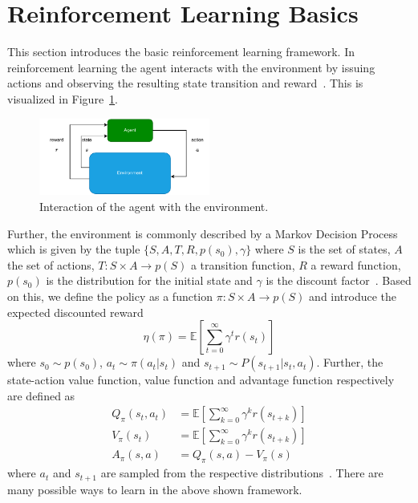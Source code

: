 \section{Reinforcement Learning Basics}\label{sec:reinforcement-learning-basics}
This section introduces the basic reinforcement learning framework.
In reinforcement learning the agent interacts with the environment by issuing actions and observing
the resulting state transition and reward~\cite{Sutton1998}.
This is visualized in Figure~\ref{fig:RL_env}.
\begin{figure}[t]
    \centering
    \includegraphics[width=0.5\textwidth]{images/presentation/RL_env.pdf}
    \caption{Interaction of the agent with the environment.}
    \label{fig:RL_env}
\end{figure}
Further, the environment is commonly described by a Markov Decision Process which is given by the tuple
$\{S, A, T, R, p(s_0), \gamma\}$ where $S$ is the set of states, $A$ the set of actions, $T: S\times A\to p(S)$ a transition
function, $R$ a reward function, $p(s_0)$ is the distribution for the initial state and
$\gamma$ is the discount factor~\cite{Moerland2020}.
Based on this, we define the policy as a function $\pi: S\times A \to p(S)$ and introduce the expected discounted reward~\cite{Schulman2015TrustRP}
\begin{equation}
    \eta(\pi) = \mathbb{E}\left[ \sum_{t=0}^\infty \gamma^t r(s_t) \right]
\end{equation}
where $s_0\sim p(s_0)$, $a_t\sim\pi(a_t|s_t)$ and $s_{t+1} \sim P(s_{t+1} | s_t, a_t)$.
Further, the state-action value function, value function and advantage function respectively are defined as
\begin{align}
    Q_\pi(s_t, a_t) &= \mathbb{E}\left[ \sum_{k=0}^\infty \gamma^kr(s_{t+k}) \right]\\
    V_{\pi}(s_t) &= \mathbb{E}\left[ \sum_{k=0}^\infty \gamma^k r(s_{t+k})  \right]\\
    A_{\pi}(s, a) &= Q_{\pi}(s,a) - V_{\pi}(s)
    \label{eq:advantage_fc}
\end{align}
where $a_t$ and $s_{t+1}$ are sampled from the respective distributions~\cite{Schulman2015TrustRP}.
There are many possible ways to learn in the above shown framework.
